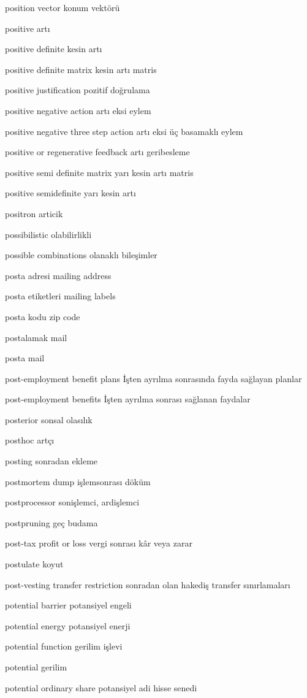 \documentclass[12pt,fleqn]{article}\usepackage{../../common}
\begin{document}
position vector konum vektörü

positive artı

positive definite kesin artı

positive definite matrix kesin artı matris

positive justification pozitif doğrulama

positive negative action artı eksi eylem

positive negative three step action artı eksi üç basamaklı eylem

positive or regenerative feedback artı geribesleme

positive semi definite matrix yarı kesin artı matris

positive semidefinite yarı kesin artı

positron articik

possibilistic olabilirlikli

possible combinations olanaklı bileşimler

posta adresi mailing address

posta etiketleri mailing labels

posta kodu zip code

postalamak mail

posta mail

post-employment benefit plans İşten ayrılma sonrasında fayda sağlayan planlar

post-employment benefits İşten ayrılma sonrası sağlanan faydalar

posterior sonsal olasılık

posthoc artçı

posting sonradan ekleme

postmortem dump işlemsonrası döküm

postprocessor sonişlemci, ardişlemci

postpruning geç budama

post-tax profit or loss vergi sonrası kâr veya zarar

postulate koyut

post-vesting transfer restriction sonradan olan hakediş transfer sınırlamaları

potential barrier potansiyel engeli

potential energy potansiyel enerji

potential function gerilim işlevi

potential gerilim

potential ordinary share potansiyel adi hisse senedi
\end{document}

